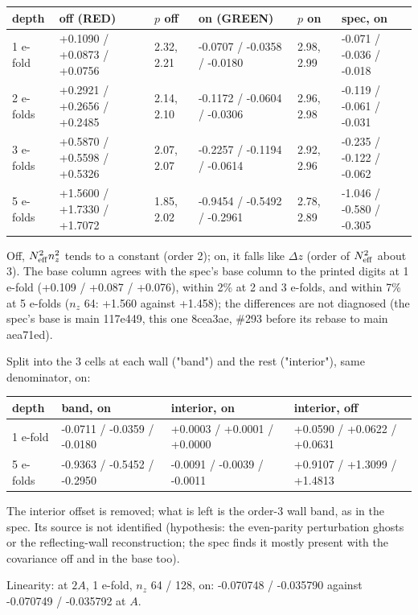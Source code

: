\documentclass[11pt,a4paper]{article}
\begin{document}
\begin{longtable}{llllll}
\toprule
depth & off (RED) & $p$ off & on (GREEN) & $p$ on & spec, on \\
\midrule
1 e-fold & +0.1090 / +0.0873 / +0.0756 & 2.32, 2.21 & -0.0707 / -0.0358 / -0.0180 & 2.98, 2.99 & -0.071 / -0.036 / -0.018 \\
2 e-folds & +0.2921 / +0.2656 / +0.2485 & 2.14, 2.10 & -0.1172 / -0.0604 / -0.0306 & 2.96, 2.98 & -0.119 / -0.061 / -0.031 \\
3 e-folds & +0.5870 / +0.5598 / +0.5326 & 2.07, 2.07 & -0.2257 / -0.1194 / -0.0614 & 2.92, 2.96 & -0.235 / -0.122 / -0.062 \\
5 e-folds & +1.5600 / +1.7330 / +1.7072 & 1.85, 2.02 & -0.9454 / -0.5492 / -0.2961 & 2.78, 2.89 & -1.046 / -0.580 / -0.305 \\
\bottomrule
\end{longtable}

Off, $N^2_{\rm eff}n_z^2$ tends to a constant (order 2); on, it falls like $\Delta z$ (order of $N^2_{\rm eff}$
about 3). The base column agrees with the spec's base column to the printed digits at 1 e-fold (+0.109 / +0.087 /
+0.076), within 2\% at 2 and 3 e-folds, and within 7\% at 5 e-folds ($n_z$ 64: +1.560 against +1.458); the
differences are not diagnosed (the spec's base is main 117e449, this one 8cea3ae, \#293 before its rebase to main aea71ed).

Split into the 3 cells at each wall ("band") and the rest ("interior"), same denominator, on:

\begin{longtable}{llll}
\toprule
depth & band, on & interior, on & interior, off \\
\midrule
1 e-fold & -0.0711 / -0.0359 / -0.0180 & +0.0003 / +0.0001 / +0.0000 & +0.0590 / +0.0622 / +0.0631 \\
5 e-folds & -0.9363 / -0.5452 / -0.2950 & -0.0091 / -0.0039 / -0.0011 & +0.9107 / +1.3099 / +1.4813 \\
\bottomrule
\end{longtable}

The interior offset is removed; what is left is the order-3 wall band, as in the spec. Its source is not
identified (hypothesis: the even-parity perturbation ghosts or the reflecting-wall reconstruction; the spec
finds it mostly present with the covariance off and in the base too).

Linearity: at $2A$, 1 e-fold, $n_z$ 64 / 128, on: -0.070748 / -0.035790 against -0.070749 / -0.035792 at $A$.
\end{document}
